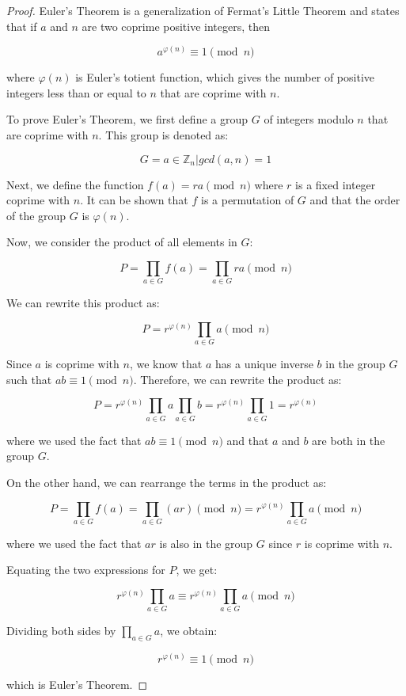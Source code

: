 \documentclass[12pt,openany]{book}
\theoremstyle{definition}
\begin{document}
	\begin{proof}
		Euler's Theorem is a generalization of Fermat's Little Theorem and states that if $a$ and $n$ are two coprime positive integers, then
		
		$$a^{\varphi(n)} \equiv 1 \pmod{n}$$
		
		where $\varphi(n)$ is Euler's totient function, which gives the number of positive integers less than or equal to $n$ that are coprime with $n$.
		
		To prove Euler's Theorem, we first define a group $G$ of integers modulo $n$ that are coprime with $n$. This group is denoted as:
		
		$$G = {a \in \mathbb{Z}_n | gcd(a,n)=1}$$
		
		Next, we define the function $f(a) = ra \pmod{n}$ where $r$ is a fixed integer coprime with $n$. It can be shown that $f$ is a permutation of $G$ and that the order of the group $G$ is $\varphi(n)$.
		
		Now, we consider the product of all elements in $G$:
		
		$$P = \prod_{a \in G} f(a) = \prod_{a \in G} ra \pmod{n}$$
		
		We can rewrite this product as:
		
		$$P = r^{\varphi(n)} \prod_{a \in G} a \pmod{n}$$
		
		Since $a$ is coprime with $n$, we know that $a$ has a unique inverse $b$ in the group $G$ such that $ab \equiv 1 \pmod{n}$. Therefore, we can rewrite the product as:
		
		$$P = r^{\varphi(n)} \prod_{a \in G} a \prod_{a \in G} b = r^{\varphi(n)} \prod_{a \in G} 1 = r^{\varphi(n)}$$
		
		where we used the fact that $ab \equiv 1 \pmod{n}$ and that $a$ and $b$ are both in the group $G$.
		
		On the other hand, we can rearrange the terms in the product as:
		
		$$P = \prod_{a \in G} f(a) = \prod_{a \in G} (ar) \pmod{n} = r^{\varphi(n)} \prod_{a \in G} a \pmod{n}$$
		
		where we used the fact that $ar$ is also in the group $G$ since $r$ is coprime with $n$.
		
		Equating the two expressions for $P$, we get:
		
		$$r^{\varphi(n)} \prod_{a \in G} a \equiv r^{\varphi(n)} \prod_{a \in G} a \pmod{n}$$
		
		Dividing both sides by $\prod_{a \in G} a$, we obtain:
		
		$$r^{\varphi(n)} \equiv 1 \pmod{n}$$
		
		which is Euler's Theorem.
	\end{proof}
	
\end{document}
